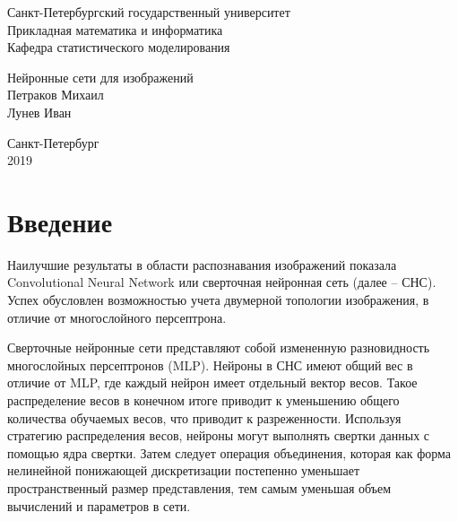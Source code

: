\documentclass[11pt,colorlinks=true]{article}
\begin{document}
	\thispagestyle{empty}
%
	\begin{center}
		Санкт-Петербургский государственный университет \\
		\vspace{0.3cm}	
		Прикладная математика и информатика \\
		\vspace{0.3cm}
		Кафедра статистического моделирования \\
		
		\vspace{6cm}			   	
			
			\vspace{0.3cm}	
			 {\huge Нейронные сети для изображений} \\
			 \vspace{0.5cm}
									Петраков Михаил \\
			Лунев Иван \\
			

			\vspace{10cm}	

		Санкт-Петербург \\
				2019
	\end{center}
	
\newpage


\tableofcontents

\newpage

\section{Введение}
Наилучшие результаты в области распознавания изображений показала Convolutional Neural Network или сверточная нейронная сеть (далее – СНС). Успех обусловлен возможностью учета двумерной топологии изображения, в отличие от многослойного персептрона. 

Сверточные нейронные сети представляют собой измененную разновидность многослойных персептронов (MLP). Нейроны в СНС имеют общий вес в отличие от MLP, где каждый нейрон имеет отдельный вектор весов. Такое распределение весов в конечном итоге приводит к уменьшению общего количества обучаемых весов, что приводит к разреженности. Используя стратегию распределения весов, нейроны могут выполнять свертки данных с помощью ядра свертки. Затем следует операция объединения, которая как форма нелинейной понижающей дискретизации постепенно уменьшает пространственный размер представления, тем самым уменьшая объем вычислений и параметров в сети.
\end{document}
